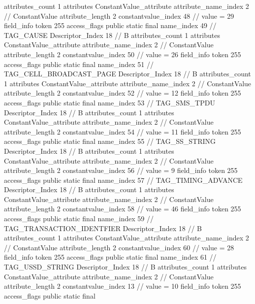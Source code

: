 {{{{{				attributes_count	1
				attributes {
				ConstantValue_attribute {
					attribute_name_index	2		// ConstantValue
					attribute_length	2
					constantvalue_index	48		// value = 29
				}
				}
			}
			field_info {
				token	255
				access_flags	public static final
				name_index	49		// TAG_CAUSE
				Descriptor_Index	18		// B
				attributes_count	1
				attributes {
				ConstantValue_attribute {
					attribute_name_index	2		// ConstantValue
					attribute_length	2
					constantvalue_index	50		// value = 26
				}
				}
			}
			field_info {
				token	255
				access_flags	public static final
				name_index	51		// TAG_CELL_BROADCAST_PAGE
				Descriptor_Index	18		// B
				attributes_count	1
				attributes {
				ConstantValue_attribute {
					attribute_name_index	2		// ConstantValue
					attribute_length	2
					constantvalue_index	52		// value = 12
				}
				}
			}
			field_info {
				token	255
				access_flags	public static final
				name_index	53		// TAG_SMS_TPDU
				Descriptor_Index	18		// B
				attributes_count	1
				attributes {
				ConstantValue_attribute {
					attribute_name_index	2		// ConstantValue
					attribute_length	2
					constantvalue_index	54		// value = 11
				}
				}
			}
			field_info {
				token	255
				access_flags	public static final
				name_index	55		// TAG_SS_STRING
				Descriptor_Index	18		// B
				attributes_count	1
				attributes {
				ConstantValue_attribute {
					attribute_name_index	2		// ConstantValue
					attribute_length	2
					constantvalue_index	56		// value = 9
				}
				}
			}
			field_info {
				token	255
				access_flags	public static final
				name_index	57		// TAG_TIMING_ADVANCE
				Descriptor_Index	18		// B
				attributes_count	1
				attributes {
				ConstantValue_attribute {
					attribute_name_index	2		// ConstantValue
					attribute_length	2
					constantvalue_index	58		// value = 46
				}
				}
			}
			field_info {
				token	255
				access_flags	public static final
				name_index	59		// TAG_TRANSACTION_IDENTFIER
				Descriptor_Index	18		// B
				attributes_count	1
				attributes {
				ConstantValue_attribute {
					attribute_name_index	2		// ConstantValue
					attribute_length	2
					constantvalue_index	60		// value = 28
				}
				}
			}
			field_info {
				token	255
				access_flags	public static final
				name_index	61		// TAG_USSD_STRING
				Descriptor_Index	18		// B
				attributes_count	1
				attributes {
				ConstantValue_attribute {
					attribute_name_index	2		// ConstantValue
					attribute_length	2
					constantvalue_index	13		// value = 10
				}
				}
			}
			field_info {
				token	255
				access_flags	public static final
}}}}}
